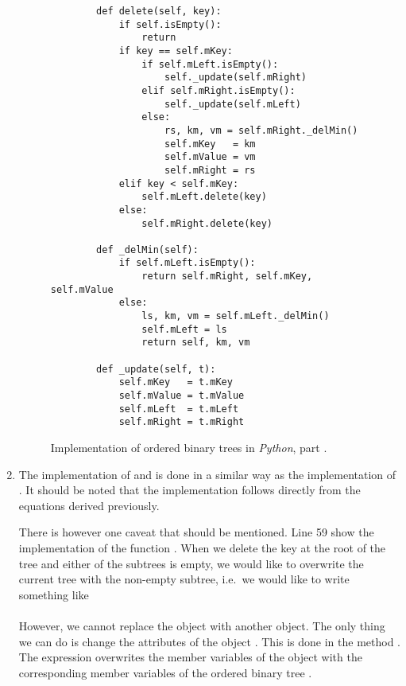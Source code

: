 \begin{enumerate}
\begin{figure}[!ht]
  \centering
\begin{verbatim}
        def delete(self, key):
            if self.isEmpty():
                return
            if key == self.mKey:
                if self.mLeft.isEmpty():
                    self._update(self.mRight)
                elif self.mRight.isEmpty():
                    self._update(self.mLeft)
                else:
                    rs, km, vm = self.mRight._delMin()
                    self.mKey   = km
                    self.mValue = vm
                    self.mRight = rs
            elif key < self.mKey:
                self.mLeft.delete(key)
            else:
                self.mRight.delete(key)
    
        def _delMin(self):
            if self.mLeft.isEmpty():
                return self.mRight, self.mKey, self.mValue
            else:
                ls, km, vm = self.mLeft._delMin()
                self.mLeft = ls
                return self, km, vm

        def _update(self, t):
            self.mKey   = t.mKey
            self.mValue = t.mValue
            self.mLeft  = t.mLeft
            self.mRight = t.mRight
\end{verbatim}
\vspace*{-0.3cm}
  \caption{Implementation of ordered binary trees in \textsl{Python}, part .}
  \label{fig:binary-tree.py-2}
\end{figure}

\item The implementation of  and  is done in a similar way as the
      implementation of .  It should be noted that the implementation follows directly from the
      equations derived  previously. 
      
      There is however one caveat that should be mentioned.  Line 59 show the implementation of the
      function .  When we delete the key at the root of the tree and either of the
      subtrees is empty, we would like to overwrite the current tree with the non-empty
      subtree, i.e.~we would like to write something like
      \\[0.2cm]
      \hspace*{1.3cm}
      \\[0.2cm]
      However, we cannot replace the object  with another object.  The only thing we can do is
      change the attributes of the object .  This is done in the method .
      The expression  overwrites the member variables of the object  with the
      corresponding member variables of the ordered binary tree . 
\end{enumerate}

